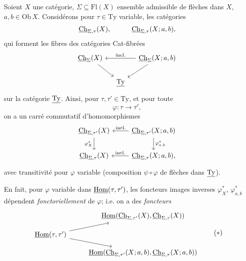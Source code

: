 Soient $X$ une catégorie, $\Sigma\subseteq\mathrm{Fl}(X)$ ensemble admissible de flèches dans $X$, $a,b\in\mathrm{Ob}\,X$. Considérons pour $\tau\in\mathrm{Ty}$ variable, les catégories
\[
\underline{\mathrm{Ch}}_{\Sigma,\tau}(X),\qquad\quad\underline{\mathrm{Ch}}_{\Sigma,\tau}(X;a,b),
\]
qui forment les fibres des catégories Cat-fibrées
\[
\begin{tikzcd}[column sep=small]
\uCh_\Sigma(X) \arrow[dr] & & \uCh_\Sigma(X;a,b) \arrow[ll, "\text{incl.}"'] \arrow[dl]\\
 & \uTy &
\end{tikzcd}
\]
sur la catégorie $\underline{\mathrm{Ty}}$. Ainsi, pour $\tau,\tau'\in\mathrm{Ty}$, et pour toute
\[
\varphi:\tau\longrightarrow\tau',
\]
on a un carré commutatif d'homomorphismes
\[
\begin{tikzcd}
\uCh_{\Sigma,\tau'}(X) \arrow[d, "\varphi^*_X"'] & \uCh_{\Sigma,\tau'}(X;a,b) \arrow[l, "\text{incl.}"'] \arrow[d, "\varphi^*_{a,b}"]\\
\uCh_{\Sigma,\tau}(X) & \uCh_{\Sigma,\tau}(X;a,b), \arrow[l, "\text{incl.}"']
\end{tikzcd}
\]
avec transitivité pour $\varphi$ variable (composition $\psi\circ\varphi$ de flèches dans $\underline{\mathrm{Ty}}$).

En fait, pour $\varphi$ variable dans $\underline{\mathrm{Hom}}(\tau,\tau')$, les foncteurs images inverses $\varphi^*_X$, $\varphi^*_{a,b}$ dépendent \textit{fonctoriellement} de $\varphi$; i.e. on a des \textit{foncteurs}
\[
\begin{tikzcd}[row sep=small]
 & \uHom(\uCh_{\Sigma,\tau'}(X),\uCh_{\Sigma,\tau}(X))\\
\uHom(\tau,\tau') \arrow[ur] \arrow[dr] & \\
 & \uHom(\uCh_{\Sigma,\tau'}(X;a,b),\uCh_{\Sigma,\tau}(X;a,b))
\end{tikzcd}
\tag*{$(*)$}
\]

\newpage
{}


